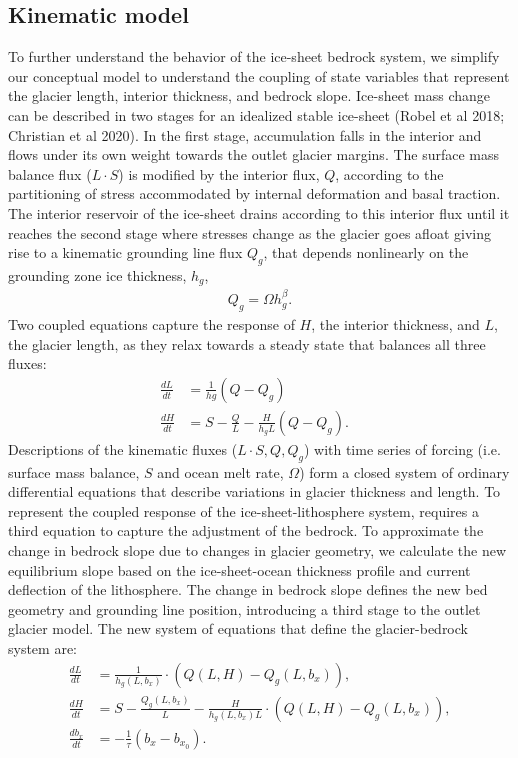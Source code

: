 \documentclass[tc, manuscript]{copernicus}
\begin{document}
\subsection{Kinematic model}

To further understand the behavior of the ice-sheet bedrock system, we simplify our conceptual model to understand the coupling of state variables that represent the glacier length, interior thickness, and bedrock slope.
Ice-sheet mass change can be described in two stages for an idealized stable ice-sheet (Robel et al 2018; Christian et al 2020).
In the first stage, accumulation falls in the interior and flows under its own weight towards the outlet glacier margins.
The surface mass balance flux ($L\cdot S$) is modified by the interior flux, $Q$, according to the partitioning of stress accommodated by internal deformation and basal traction.
The interior reservoir of the ice-sheet drains according to this interior flux until it reaches the second stage where stresses change as the glacier goes afloat giving rise to a kinematic grounding line flux $Q_g$, that depends nonlinearly on the grounding zone ice thickness, $h_g$,
\begin{align}
Q_g=\Omega h_g^\beta.
\end{align}
 Two coupled equations capture the response of $H$, the interior thickness, and $L$, the glacier length, as they relax towards a steady state that balances all three fluxes:
 \begin{align}
 \frac{dL}{dt} &=\frac{1}{hg}(Q-Q_g) \\
\frac{dH}{dt} &=S - \frac{Q}{L}-\frac{H}{h_g L}(Q-Q_g).& 
\end{align}
Descriptions of the kinematic fluxes ($L\cdot S, Q, Q_g$) with time series of forcing (i.e. surface mass balance, $S$ and ocean melt rate, $\Omega$) form a closed system of ordinary differential equations that describe variations in glacier thickness and length. 
To represent the coupled response of the ice-sheet-lithosphere system, requires a third equation to capture the adjustment of the bedrock.
To approximate the change in bedrock slope due to changes in glacier geometry, we calculate the new equilibrium slope based on the ice-sheet-ocean thickness profile and current deflection of the lithosphere. 
The change in bedrock slope defines the new bed geometry and grounding line position, introducing a third stage to the outlet glacier model.
The new system of equations that define the glacier-bedrock system are:
\begin{align}
    \frac{dL}{dt} & = \frac{1}{h_g(L,b_x)}\cdot(Q(L,H)-Q_g(L,b_x)), \\
    \frac{dH}{dt} & = S-\frac{Q_g(L,b_x)}{L}-\frac{H}{h_g(L,b_x) L} \cdot (Q(L,H)-Q_g(L,b_x)), \\
    \frac{db_x}{dt} & = -\frac{1}{\tau}(b_x - b_{x_0}).
\end{align}
\end{document}
